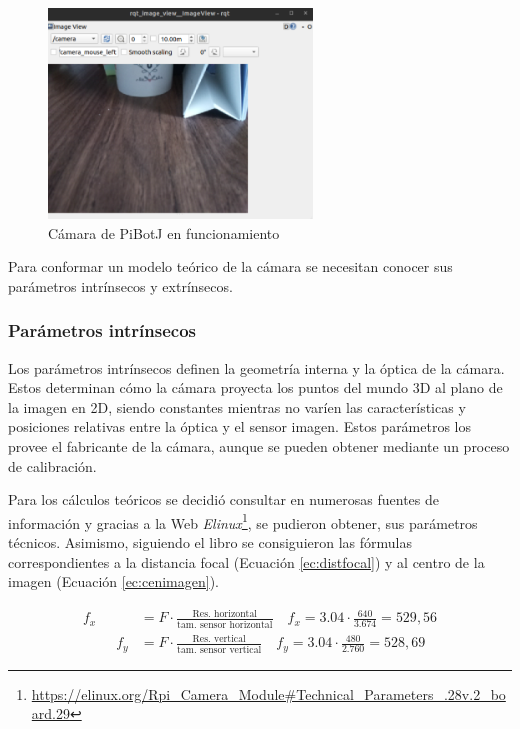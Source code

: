  \begin{figure} [h!]
	\begin{center}
		\includegraphics[width=7cm]{figs/cap6/camerarr.png}
	\end{center}
	\caption{Cámara de PiBotJ en funcionamiento}
	\label{fig:camararr}
\end{figure}

Para conformar un modelo teórico de la cámara se necesitan conocer sus parámetros intrínsecos y extrínsecos.

\subsubsection{Parámetros intrínsecos}
\label{subsubsec:intrinsecoscamara}

Los parámetros intrínsecos definen la geometría interna y la óptica de la cámara. Estos determinan cómo la cámara proyecta los puntos del mundo 3D al plano de la imagen en 2D, siendo constantes mientras no varíen las características y posiciones relativas entre la óptica y el sensor imagen. Estos parámetros los provee el fabricante de la cámara, aunque se pueden obtener mediante un proceso de calibración.

Para los cálculos teóricos se decidió consultar en numerosas fuentes de información y gracias a la Web \textit{Elinux}\footnote{\url{https://elinux.org/Rpi_Camera_Module\#Technical_Parameters_.28v.2_board.29}}, se pudieron obtener, sus parámetros técnicos. Asimismo, siguiendo el libro \cite{Hartley2004} se consiguieron las fórmulas correspondientes a la distancia focal (Ecuación \ref{ec:distfocal}) y al centro de la imagen (Ecuación \ref{ec:cenimagen}).


\begin{myequation}[h]
	\begin{align}
		f_x &= F \cdot \frac{\text{Res. horizontal}}{\text{tam. sensor horizontal}} \quad
		f_x = 3.04 \cdot \frac{640}{3.674} = 529,56 
		\nonumber\\
		\hspace{1cm}
		f_y &= F \cdot \frac{\text{Res. vertical}}{\text{tam. sensor vertical}} \quad
		f_y = 3.04 \cdot \frac{480}{2.760} = 528,69
		\nonumber
	\end{align}
	\caption[Fórmula para calcular la distancia focal teórica]{Fórmula para calcular la distancia focal teórica}
	\label{ec:distfocal}
\end{myequation}

